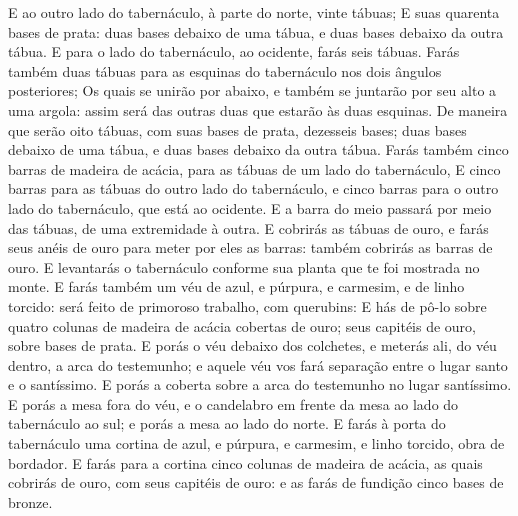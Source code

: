 {{  E ao outro lado do tabernáculo, à parte do norte, vinte tábuas;
  E suas quarenta bases de prata: duas bases debaixo de uma tábua, e duas bases debaixo da outra tábua.
  E para o lado do tabernáculo, ao ocidente, farás seis tábuas.
  Farás também duas tábuas para as esquinas do tabernáculo nos dois ângulos posteriores;
  Os quais se unirão por abaixo, e também se juntarão por seu alto a uma argola: assim será das outras duas que estarão às duas esquinas.
  De maneira que serão oito tábuas, com suas bases de prata, dezesseis bases; duas bases debaixo de uma tábua, e duas bases debaixo da outra tábua.
  Farás também cinco barras de madeira de acácia, para as tábuas de um lado do tabernáculo,
  E cinco barras para as tábuas do outro lado do tabernáculo, e cinco barras para o outro lado do tabernáculo, que está ao ocidente.
  E a barra do meio passará por meio das tábuas, de uma extremidade à outra.
  E cobrirás as tábuas de ouro, e farás seus anéis de ouro para meter por eles as barras: também cobrirás as barras de ouro.
  E levantarás o tabernáculo conforme sua planta que te foi mostrada no monte.
  E farás também um véu de azul, e púrpura, e carmesim, e de linho torcido: será feito de primoroso trabalho, com querubins:
  E hás de pô-lo sobre quatro colunas de madeira de acácia cobertas de ouro; seus capitéis de ouro, sobre bases de prata.
  E porás o véu debaixo dos colchetes, e meterás ali, do véu dentro, a arca do testemunho; e aquele véu vos fará separação entre o lugar santo e o santíssimo.
  E porás a coberta sobre a arca do testemunho no lugar santíssimo.
  E porás a mesa fora do véu, e o candelabro em frente da mesa ao lado do tabernáculo ao sul; e porás a mesa ao lado do norte.
  E farás à porta do tabernáculo uma cortina de azul, e púrpura, e carmesim, e linho torcido, obra de bordador.
  E farás para a cortina cinco colunas de madeira de acácia, as quais cobrirás de ouro, com seus capitéis de ouro: e as farás de fundição cinco bases de bronze}.
\par }

